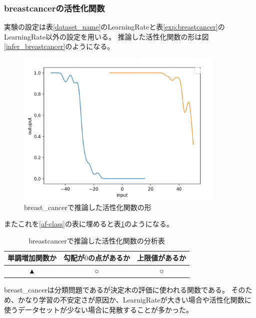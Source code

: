\subsubsection{breastcancerの活性化関数}
実験の設定は表\ref{dataset_name}のLearningRateと表\ref{exp:breastcancer}のLearningRate以外の設定を用いる。
推論した活性化関数の形は図\ref{infer_breastcancer}のようになる。
\begin{figure}[hbtp]
    \begin{center}
        \includegraphics[width=10cm]{asset/breastcancer-0.01.png}
            \caption{breast\_cancerで推論した活性化関数の形}
            \label{ifer_breastcancer}
    \end{center}
\end{figure}

またこれを\ref{af-class}の表に埋めると表\ref{anal_breastcancer}のようになる。
\begin{table}[htbp]
    \begin{center}
        \caption{breastcancerで推論した活性化関数の分析表}
        \label{anal_breastcancer}
        \vspace{2mm} 
        \begin{tabular}{ |c|c|c| }
        単調増加関数か & 勾配が$ 0 $の点があるか & 上限値があるか   \\
        \hline
        ▲ & ○ & ○   \\
        \end{tabular}
    \end{center}
\end{table}


breast\_cancerは分類問題であるが決定木の評価に使われる関数である。
そのため、かなり学習の不安定さが原因か、LearnigRateが大きい場合や活性化関数に使うデータセットが少ない場合に発散することが多かった。




